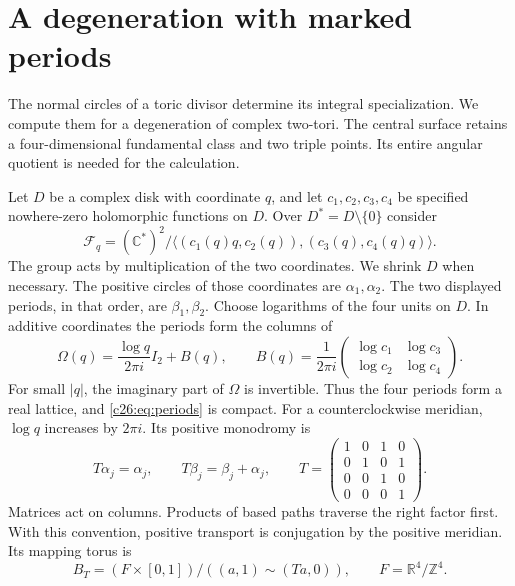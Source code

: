 \section{A degeneration with marked periods}

The normal circles of a toric divisor determine its integral specialization.
We compute them for a degeneration of complex two-tori.
The central surface retains a four-dimensional fundamental class and two
triple points. Its entire angular quotient is needed for the calculation.

Let $D$ be a complex disk with coordinate $q$, and let
$c_1,c_2,c_3,c_4$ be specified nowhere-zero holomorphic functions on $D$.
Over $D^*=D\setminus\{0\}$ consider
\begin{equation}\label{c26:eq:periods}
\mathcal F_q=(\mathbb C^*)^2/
\langle (c_1(q)q,c_2(q)),(c_3(q),c_4(q)q)\rangle.
\end{equation}
The group acts by multiplication of the two coordinates.
We shrink $D$ when necessary. The positive circles of those coordinates
are $\alpha_1,\alpha_2$. The two displayed periods, in that order, are
$\beta_1,\beta_2$.
Choose logarithms of the four units on $D$.
In additive coordinates the periods form the columns of
\[
\Omega(q)=\frac{\log q}{2\pi i}I_2+B(q),
\qquad
B(q)=\frac1{2\pi i}
\begin{pmatrix}\log c_1&\log c_3\\\log c_2&\log c_4\end{pmatrix}.
\]
For small $|q|$, the imaginary part of $\Omega$ is invertible.
Thus the four periods form a real lattice, and \eqref{c26:eq:periods} is compact.
For a counterclockwise meridian, $\log q$ increases by $2\pi i$.
Its positive monodromy is
\begin{equation}\label{c26:eq:T}
T\alpha_j=\alpha_j,\qquad T\beta_j=\beta_j+\alpha_j,
\qquad
T=\begin{pmatrix}1&0&1&0\\0&1&0&1\\0&0&1&0\\0&0&0&1\end{pmatrix}.
\end{equation}
Matrices act on columns. Products of based paths traverse the right
factor first. With this convention, positive transport is conjugation
by the positive meridian. Its mapping torus is
\begin{equation}\label{c26:eq:boundary}
B_T=(F\times[0,1])/((a,1)\sim(Ta,0)),
\qquad F=\mathbb R^4/\mathbb Z^4.
\end{equation}

